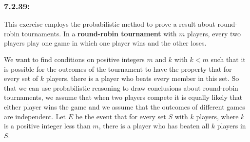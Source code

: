\documentclass[a4paper]{article}
\begin{document}
	\subsubsection*{7.2.39:}
	This exercise employs the probabilistic method to prove a result about round-robin tournaments. In a \textbf{round-robin tournament} with $m$ players, every two players play one game in which one player wins and the other loses.
	
	We want to find conditions on positive integers $m$ and $k$ with $k<m$ such that it is possible for the outcomes of the tournament to have the property that for every set of $k$ players, there is a player who beats every member in this set. So that we can use probabilistic reasoning to draw conclusions about round-robin tournaments, we assume that when two players compete it is equally likely that either player wins the game and we assume that the outcomes of different games are independent. Let $E$ be the event that for every set $S$ with $k$ players, where $k$ is a positive integer less than $m$, there is a player who has beaten all $k$ players in $S$.
\end{document}
